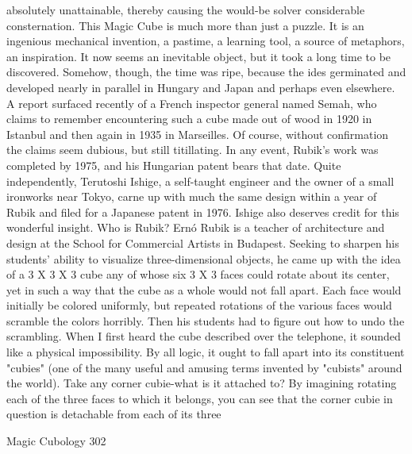absolutely unattainable, thereby causing the would-be solver considerable
consternation.
        This Magic Cube is much more than just a puzzle. It is an ingenious
mechanical invention, a pastime, a learning tool, a source of metaphors, an
inspiration. It now seems an inevitable object, but it took a long time to be discovered.
Somehow, though, the time was ripe, because the ides germinated and developed
nearly in parallel in Hungary and Japan and perhaps even elsewhere. A report
surfaced recently of a French inspector general named Semah, who claims to
remember encountering such a cube made out of wood in 1920 in Istanbul and then
again in 1935 in Marseilles. Of course, without confirmation the claims seem dubious,
but still titillating. In any event, Rubik's work was completed by 1975, and his
Hungarian patent bears that date. Quite independently, Terutoshi Ishige, a self-taught
engineer and the owner of a small ironworks near Tokyo, carne up with much the
same design within a year of Rubik and filed for a Japanese patent in 1976. Ishige
also deserves credit for this wonderful insight.
        Who is Rubik? Ernó Rubik is a teacher of architecture and design at the
School for Commercial Artists in Budapest. Seeking to sharpen his students' ability to
visualize three-dimensional objects, he came up with the idea of a 3 X 3 X 3 cube any
of whose six 3 X 3 faces could rotate about its center, yet in such a way that the cube
as a whole would not fall apart. Each face would initially be colored uniformly, but
repeated rotations of the various faces would scramble the colors horribly. Then his
students had to figure out how to undo the scrambling.
        When I first heard the cube described over the telephone, it sounded like a
physical impossibility. By all logic, it ought to fall apart into its constituent "cubies"
(one of the many useful and amusing terms invented by "cubists" around the world).
Take any corner cubie-what is it attached to? By imagining rotating each of the three
faces to which it belongs, you can see that the corner cubie in question is detachable
from each of its three




Magic Cubology                                                                        302


